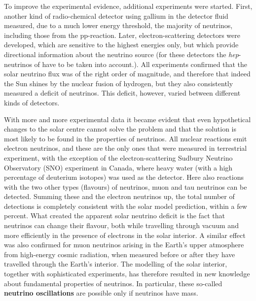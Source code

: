 \documentclass[a4paper,10pt]{article}
\begin{document}
{\noindent}To improve the experimental evidence, additional experiments were started. First, another kind of radio-chemical detector using gallium in the detector fluid measured, due to a much lower energy threshold, the majority of neutrinos, including those from the pp-reaction. Later, electron-scattering detectors were developed, which are sensitive to the highest energies only, but which provide directional information about the neutrino source (for these detectors the \textit{hep}-neutrinos of have to be taken into account.). All experiments confirmed that the solar neutrino flux was of the right order of magnitude, and therefore that indeed the Sun shines by the nuclear fusion of hydrogen, but they also consistently measured a deficit of neutrinos. This deficit, however, varied between different kinds of detectors.

{\noindent}With more and more experimental data it became evident that even hypothetical changes to the solar centre cannot solve the problem and that the solution is most likely to be found in the properties of neutrinos. All nuclear reactions emit electron neutrinos, and these are the only ones that were measured in terrestrial experiment, with the exception of the electron-scattering Sudbury Neutrino Observatory (SNO) experiment in Canada, where heavy water (with a high percentage of deuterium isotopes) was used as the detector. Here also reactions with the two other types (flavours) of neutrinos, muon and tau neutrinos can be detected. Summing these and the electron neutrinos up, the total number of detections is completely consistent with the solar model prediction, within a few percent. What created the apparent solar neutrino deficit is the fact that neutrinos can change their flavour, both while travelling through vacuum and more efficiently in the presence of electrons in the solar interior. A similar effect was also confirmed for muon neutrinos arising in the Earth's upper atmosphere from high-energy cosmic radiation, when measured before or after they have travelled through the Earth's interior. The modelling of the solar interior, together with sophisticated experiments, has therefore resulted in new knowledge about fundamental properties of neutrinos. In particular, these so-called \textbf{neutrino oscillations} are possible only if neutrinos have mass.
\end{document}
